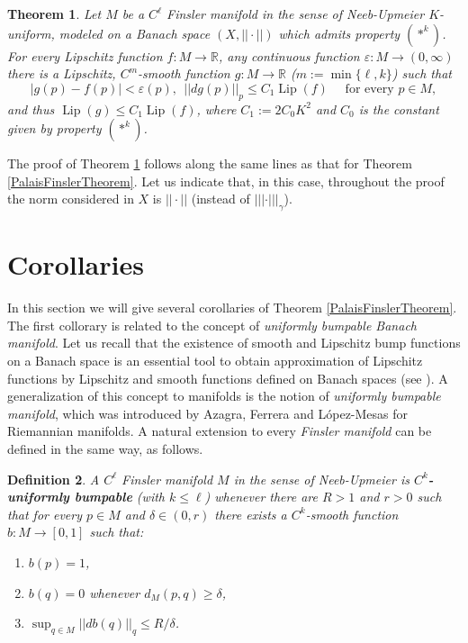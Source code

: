 \documentclass[11pt]{amsart}
\newtheorem{thm}{Theorem}[section]
\newtheorem{defn}[thm]{Definition}
\numberwithin{equation}{section}
\begin{document}
\begin{thm}\label{FinslerTheorem}
Let $M$ be a $C^\ell$ Finsler manifold in the sense of Neeb-Upmeier $K$-uniform, modeled on a Banach space $(X,||\cdot||)$ which admits property $(*^k)$. For every Lipschitz function $f:M\to{\mathbb{R}}$, any  continuous function $\varepsilon:M\to(0,\infty)$  there is a Lipschitz, $C^m$-smooth function $g:M\to{\mathbb{R}}$  ($m:={\min\{\ell,k\}}$)  such that
\begin{equation*}
|g(p)-f(p)|<\varepsilon(p),   \  \  || dg(p)||_p\le C_1 {\operatorname{Lip}}(f) \quad  \text{ for every } p\in M,
\end{equation*}
and thus $ {\operatorname{Lip}}(g)\le C_1 {\operatorname{Lip}}(f)$, where $C_1:=2C_0 K^2$
and $C_0$ is the constant given by property $(*^k)$.
\end{thm}
 The proof of Theorem \ref{FinslerTheorem} follows along the same lines as that for Theorem
\ref{PalaisFinslerTheorem}. Let us  indicate that,
in this case,  throughout the proof the norm considered in $X$  is
 $||\cdot||$ (instead of $|||\cdot|||_\gamma$).

\section{Corollaries}
In this section we will give several corollaries of Theorem \ref{PalaisFinslerTheorem}.
The first collorary is related to the concept of {\em uniformly bumpable Banach manifold}.
Let us recall that the existence of  smooth and Lipschitz bump functions on a Banach space is an essential tool to  obtain approximation of Lipschitz functions by Lipschitz and smooth functions defined on Banach spaces (see \cite{azafrymon, Fry1, HajekJohanis}). A generalization of this concept to manifolds is the notion of  \emph{uniformly bumpable manifold}, which was introduced by Azagra, Ferrera and L\'opez-Mesas \cite{AzFeMe} for Riemannian manifolds. A natural extension to every  \emph{Finsler manifold} can be defined in the same way, as follows.
\begin{defn}\label{bumpable}
A  $C^\ell$  Finsler manifold $M$ in the sense of Neeb-Upmeier  is \textbf{$C^k$-uniformly bumpable} (with $k\le \ell$) whenever there are $R>1$ and $r>0$ such that for every $p\in M$ and $\delta\in (0,r)$ there exists a $C^k$-smooth function $b:M\to[0,1]$ such that:
\begin{enumerate}
\item $b(p)=1$,
\item $b(q)=0$ whenever $d_M(p,q)\ge \delta$,
\item $\sup_{q\in M} ||d b(q)||_q \le R/\delta$.
\end{enumerate}
\end{defn}
\end{document}

